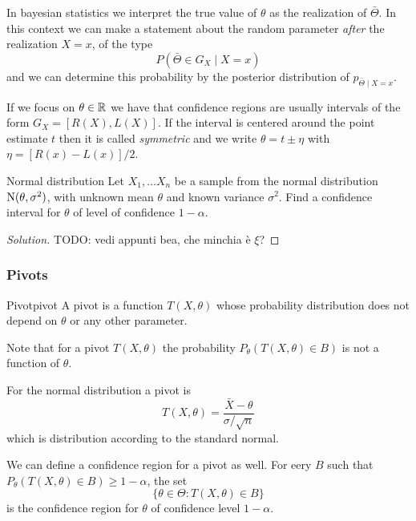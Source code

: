 \documentclass[12pt]{extarticle}
\newcommand{\Normal}{{\operatorfont N}}
\begin{document}
In bayesian statistics we interpret the true value of $\theta$ as the realization of $\bar \Theta$.
In this context we can make a statement about the random parameter \emph{after} the realization $X = x$, of the type
\begin{equation}
    P(\bar \Theta \in G_X \mid X = x)
\end{equation}
and we can determine this probability by the posterior distribution of $p_{\bar \Theta \mid X = x}$.

If we focus on $\theta \in \mathbb{R}$ we have that confidence regions are usually intervals of the form $G_X = [R(X), L(X)]$.
If the interval is centered around the point estimate $t$ then it is called \emph{symmetric} and we write $\theta = t \pm \eta$ with $\eta = [R(x) - L(x)]/2$.

\begin{example}{Normal distribution}{}
    Let $X_1, \dots X_n$ be a sample from the normal distribution $\Normal(\theta, \sigma^2)$, with unknown mean $\theta$ and known variance $\sigma^2$.
    Find a confidence interval for $\theta$ of level of confidence $1-\alpha$.
\end{example}

\begin{proof}[Solution]
    TODO: vedi appunti bea, che minchia è $\xi$?
\end{proof}

\subsubsection{Pivots}

\begin{definition}{Pivot}{pivot}
    A pivot is a function $T(X, \theta)$ whose probability distribution does not depend on $\theta$ or any other parameter.
\end{definition}

Note that for a pivot $T(X, \theta)$ the probability $P_\theta(T(X, \theta) \in B)$ is not a function of $\theta$.

For the normal distribution a pivot is
\begin{equation}
    T(X, \theta) = \frac{\bar X - \theta}{\sigma /\sqrt{n}}
\end{equation}
which is distribution according to the standard normal.

We can define a confidence region for a pivot as well.
For eery $B$ such that $P_\theta(T(X, \theta) \in B) \geq 1- \alpha$, the set
\begin{equation}
    \{ \theta \in \Theta : T(X, \theta) \in B \}
\end{equation}
is the confidence region for $\theta$ of confidence level $1- \alpha$.
\end{document}
